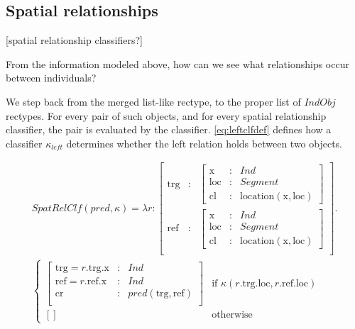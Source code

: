\documentclass[11pt, a4paper]{article}
\begin{document}
\subsection{Spatial relationships}

[spatial relationship classifiers?]

From the information modeled above, how can we see what relationships occur between individuals?

We step back from the merged list-like rectype, to the proper list of $IndObj$ rectypes.
For every pair of such objects, and for every spatial relationship classifier, the pair is evaluated by the classifier.
\autoref{eq:leftclfdef} defines how a classifier $\kappa_{left}$ determines whether the $\text{left}$ relation holds between two objects.

\begin{multline}\label{eq:leftclfdef}
SpatRelClf(pred, \kappa) = 
\lambda r :
\left[\begin{array}{rcl}
    \text{trg}&:&\left[\begin{array}{rcl}
        \text{x}&:&Ind\\
        \text{loc}&:&Segment\\
        \text{cl}&:& \text{location}(\text{x},\text{loc})
    \end{array}\right]\\
    \text{ref}&:&\left[\begin{array}{rcl}
        \text{x}&:&Ind\\
        \text{loc}&:&Segment\\
        \text{cl}&:& \text{location}(\text{x},\text{loc})
    \end{array}\right]\\
\end{array}\right] .\\
\begin{cases}
\left[\begin{array}{lcl}
    \text{trg}=r.\text{trg}.\text{x} &:& Ind\\
    \text{ref}=r.\text{ref}.\text{x} &:& Ind\\
    \text{cr} &:& pred(\text{trg}, \text{ref})\\
\end{array}\right]
& \text{if } \kappa(r.\text{trg}.\text{loc}, r.\text{ref}.\text{loc}) \\
[] & \text{otherwise}
\end{cases}
\end{multline}
\end{document}
